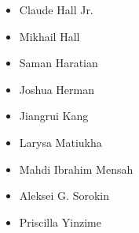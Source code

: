 \begin{itemize}
	\item Claude Hall Jr.
	\item Mikhail Hall
	\item Saman Haratian
	\item Joshua Herman
	\item Jiangrui Kang
	\item Larysa Matiukha
	\item Mahdi Ibrahim Mensah
	\item Aleksei G. Sorokin
	\item Priscilla Yinzime
\end{itemize}